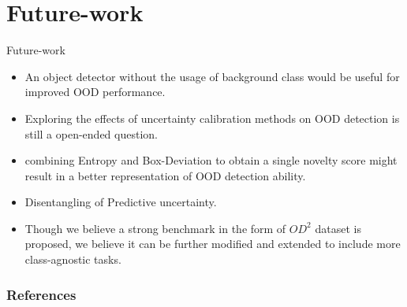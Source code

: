 \documentclass[10pt, aspectratio=169]{beamer}
\begin{document}
\section{Future-work}
\begin{frame}[allowframebreaks]{Future-work}
    \begin{itemize}
        \item An object detector without the usage of background class would be useful for improved OOD performance.
        \item Exploring the effects of uncertainty calibration methods \cite{GuoCalibration2017} on OOD detection is still a open-ended question.
        \item combining Entropy and Box-Deviation to obtain a single novelty score might result in a better representation of OOD detection ability.
        \item Disentangling of Predictive uncertainty.
        \item Though we believe a strong benchmark in the form of $OD^2$ dataset is proposed, we believe it can be further modified and extended to include more class-agnostic tasks.
    \end{itemize}
\end{frame}

\begin{frame}[allowframebreaks]
    \frametitle{References}
    
    {\small
}
\end{frame}
\end{document}
